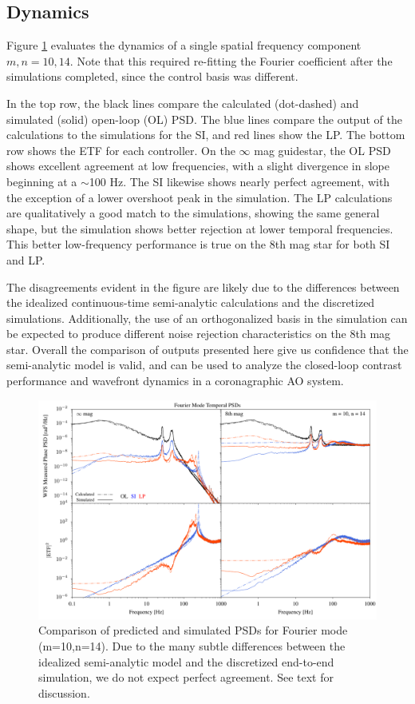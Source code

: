 \documentclass[10pt,preprint]{aastex631}
\begin{document}
\subsection{Dynamics}
Figure \ref{fig:opd_psdcomp} evaluates the dynamics of a single spatial frequency component  $m,n = 10,14$.  Note that this required re-fitting the Fourier coefficient after the simulations completed, since the control basis was different.

In the top row, the black lines compare the calculated (dot-dashed) and simulated (solid) open-loop (OL) PSD.  The blue lines compare the output of the calculations to the simulations for the SI, and red lines show the LP.  The bottom row shows the ETF for each controller.  On the $\infty$ mag guidestar, the OL PSD shows excellent agreement at low frequencies, with a slight divergence in slope beginning at a $\sim$100 Hz. The SI likewise shows nearly perfect agreement, with the exception of a lower overshoot peak in the simulation.  The LP calculations are qualitatively a good match to the simulations, showing the same general shape, but the simulation shows better rejection at lower temporal frequencies.  This better low-frequency performance is true on the 8th mag star for both SI and LP.  

The disagreements evident in the figure are likely due to the differences between the idealized continuous-time semi-analytic calculations and the discretized simulations.  Additionally, the use of an orthogonalized basis in the simulation can be expected to produce different noise rejection characteristics on the 8th mag star.   Overall the comparison of outputs presented here give us confidence that the semi-analytic model is valid, and can be used to analyze the closed-loop contrast performance and wavefront dynamics in a coronagraphic AO system.

\begin{figure}
\hspace{-0.3in}
\includegraphics[width=6.5in]{psdcomp_10_14.pdf}
\caption{Comparison of predicted and simulated PSDs for Fourier mode (m=10,n=14).  Due to the many subtle differences between the idealized semi-analytic model and the discretized end-to-end simulation, we do not expect perfect agreement.  See text for discussion.    \label{fig:opd_psdcomp}}
\end{figure}
\end{document}

